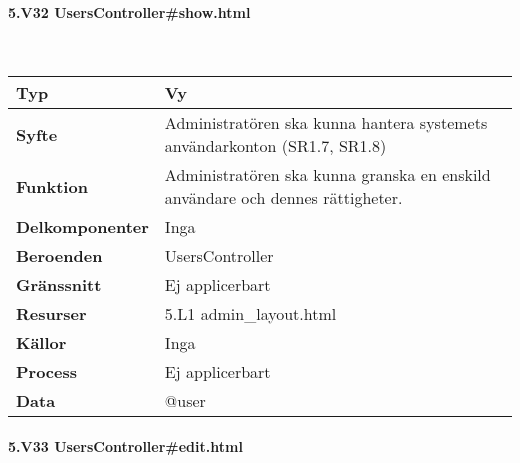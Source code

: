 \documentclass[a4paper, twoside, 11pt, titlepage]{article}
\begin{document}
			\clearpage %
			\paragraph{5.V32 UsersController\#show.html}\

			\begin {table} [ht] \begin{tabular} {  p{3.5cm} p{11.6cm} }
				\hline
				{\sffamily\textbf{Typ}} & {Vy} \\
				\hline
				{\sffamily\textbf{Syfte}} & {Administratören ska kunna hantera systemets användarkonton (SR1.7, SR1.8)} \\
				\hline
				{\sffamily\textbf{Funktion}} & {Administratören ska kunna granska en enskild användare och dennes rättigheter.} \\
				\hline
				{\sffamily\textbf{Delkomponenter}} & {Inga} \\
				\hline
				{\sffamily\textbf{Beroenden}} & {UsersController} \\
				\hline
				{\sffamily\textbf{Gränssnitt}} & {Ej applicerbart} \\
				\hline
				{\sffamily\textbf{Resurser}} & {5.L1 admin\_layout.html} \\
				\hline
				{\sffamily\textbf{Källor}} & {Inga} \\
				\hline
				{\sffamily\textbf{Process}} & {Ej applicerbart} \\
				\hline
				{\sffamily\textbf{Data}} & {@user} \\
				\hline
			\end{tabular} \end{table} \FloatBarrier


			\paragraph{5.V33 UsersController\#edit.html}\
\end{document}
